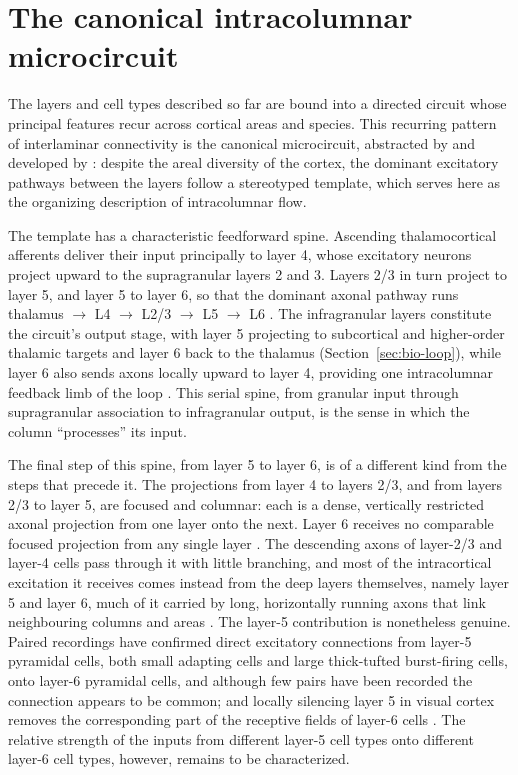 \section{The canonical intracolumnar microcircuit}
\label{sec:bio-canonical}

The layers and cell types described so far are bound into a directed circuit whose principal features recur across cortical areas and 
species. This recurring pattern of interlaminar connectivity is the canonical microcircuit, abstracted by \textcite{douglas1989} and
 developed by \textcite{douglas2004}: despite the areal diversity of the cortex, the dominant excitatory pathways between the layers 
 follow a stereotyped template, which serves here as the organizing description of intracolumnar flow.

The template has a characteristic feedforward spine. Ascending thalamocortical afferents deliver their input principally to layer 4, 
whose excitatory neurons project upward to the supragranular layers 2 and 3. Layers 2/3 in turn project to layer 5, and layer 5 to layer 6, so that the dominant axonal pathway runs thalamus $\rightarrow$ L4 $\rightarrow$ L2/3 $\rightarrow$ L5 $\rightarrow$ L6 \parencite{douglas2004, white1989}. The infragranular layers constitute the circuit's output stage, with layer 5 projecting to subcortical and higher-order thalamic targets and layer 6 back to the thalamus (Section~\ref{sec:bio-loop}), while layer 6 also sends axons locally upward to layer 4, providing one intracolumnar feedback limb of the loop \parencite{shepherd2018}. This serial spine, from granular input through supragranular association to infragranular output, is the sense in which the column ``processes'' its input.

The final step of this spine, from layer 5 to layer 6, is of a different kind from the steps that precede it. The projections from 
layer 4 to layers 2/3, and from layers 2/3 to layer 5, are focused and columnar: each is a dense, vertically restricted axonal projection from one layer onto the next. Layer 6 receives no comparable focused projection from any single layer \parencite{thomson2010layer6}. The descending axons of layer-2/3 and layer-4 cells pass through it with little branching, and most of the intracortical excitation it receives comes instead from the deep layers themselves, namely layer 5 and layer 6, much of it carried by long, horizontally running axons that link neighbouring columns and areas \parencite{thomson2010layer6}. The layer-5 contribution is nonetheless genuine. Paired recordings have confirmed direct excitatory connections from layer-5 pyramidal cells, both small adapting cells and large thick-tufted burst-firing cells, onto layer-6 pyramidal cells, and although few pairs have been recorded the connection appears to be common; and locally silencing layer 5 in visual cortex removes the corresponding part of the receptive fields of layer-6 cells \parencite{thomson2010layer6}. The relative strength of the inputs from different layer-5 cell types onto different layer-6 cell types, however, remains to be characterized.

